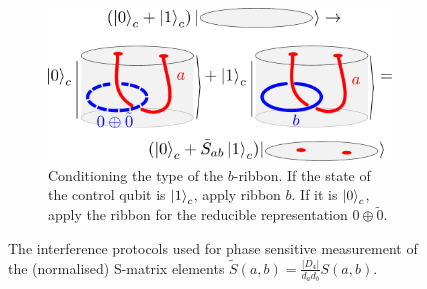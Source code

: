 \documentclass[a4paper,twocolumn,11pt]{quantumarticle}
\begin{document}
\begin{figure}
\begin{subfigure}{0.47\textwidth}
    \includegraphics[width=\linewidth]{Figures/intefFlav.pdf}
    \caption{Conditioning the type of the $b$-ribbon. If the state of the control qubit is $\ket{1}_c$, apply ribbon $b$. If it is $\ket{0}_c$, apply the ribbon for the reducible representation $0\oplus\tilde{0}$.}
    \label{fig:cond_flav}
\end{subfigure}

\caption{The interference protocols used for phase sensitive measurement of the (normalised) S-matrix elements  $\tilde{S}(a,b) = \frac{|D_4|}{d_a d_b}S(a,b)$.	}
\label{fig:S-mat}
\end{figure}
\end{document}
